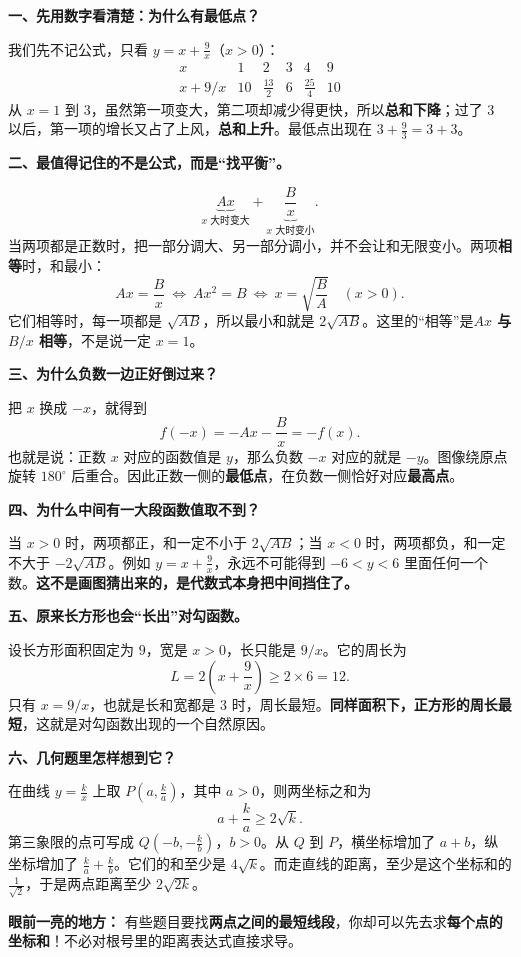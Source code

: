 \begin{explanationbox}
\textbf{一、先用数字看清楚：为什么有最低点？}

我们先不记公式，只看 $y=x+\frac9x$（$x>0$）：
\[
\begin{array}{c|ccccc}
x&1&2&3&4&9\\\hline
x+9/x&10&\frac{13}{2}&\boxed6&\frac{25}{4}&10
\end{array}
\]
从 $x=1$ 到 $3$，虽然第一项变大，第二项却减少得更快，所以\textbf{总和下降}；过了 $3$ 以后，第一项的增长又占了上风，\textbf{总和上升}。最低点出现在 $3+\frac93=3+3$。


\textbf{二、最值得记住的不是公式，而是“找平衡”。}

\[
\underbrace{Ax}_{\text{$x$ 大时变大}}+\underbrace{\frac Bx}_{\text{$x$ 大时变小}}.
\]
当两项都是正数时，把一部分调大、另一部分调小，并不会让和无限变小。两项\textbf{相等}时，和最小：
\[
Ax=\frac Bx\ \Longleftrightarrow\ Ax^2=B
\ \Longleftrightarrow\ x=\sqrt{\frac BA}\quad(x>0).
\]
它们相等时，每一项都是 $\sqrt{AB}$，所以最小和就是 $2\sqrt{AB}$。这里的“相等”是\textbf{$Ax$ 与 $B/x$ 相等}，不是说一定 $x=1$。

\medskip
\end{explanationbox}
\clearpage
\begin{explanationbox}
\textbf{三、为什么负数一边正好倒过来？}

把 $x$ 换成 $-x$，就得到
\[
f(-x)=-Ax-\frac Bx=-f(x).
\]
也就是说：正数 $x$ 对应的函数值是 $y$，那么负数 $-x$ 对应的就是 $-y$。图像绕原点旋转 $180^\circ$ 后重合。因此正数一侧的\textbf{最低点}，在负数一侧恰好对应\textbf{最高点}。

\medskip
\textbf{四、为什么中间有一大段函数值取不到？}

当 $x>0$ 时，两项都正，和一定不小于 $2\sqrt{AB}$；当 $x<0$ 时，两项都负，和一定不大于 $-2\sqrt{AB}$。例如 $y=x+\frac9x$，永远不可能得到 $-6<y<6$ 里面任何一个数。\textbf{这不是画图猜出来的，是代数式本身把中间挡住了。}

\medskip
\textbf{五、原来长方形也会“长出”对勾函数。}

设长方形面积固定为 $9$，宽是 $x>0$，长只能是 $9/x$。它的周长为
\[
L=2\left(x+\frac9x\right)\ge 2\times6=12.
\]
只有 $x=9/x$，也就是长和宽都是 $3$ 时，周长最短。\textbf{同样面积下，正方形的周长最短}，这就是对勾函数出现的一个自然原因。

\medskip
\textbf{六、几何题里怎样想到它？}

在曲线 $y=\frac{k}{x}$ 上取 $P(a,\frac{k}{a})$，其中 $a>0$，则两坐标之和为
\[
a+\frac{k}{a}\ge2\sqrt{k}.
\]
第三象限的点可写成 $Q(-b,-\frac{k}{b})$，$b>0$。从 $Q$ 到 $P$，横坐标增加了 $a+b$，纵坐标增加了 $\frac{k}{a}+\frac{k}{b}$。它们的和至少是 $4\sqrt{k}$。而走直线的距离，至少是这个坐标和的 $\frac1{\sqrt2}$，于是两点距离至少 $2\sqrt{2k}$。

\textbf{眼前一亮的地方：} 有些题目要找\textbf{两点之间的最短线段}，你却可以先去求\textbf{每个点的坐标和}！不必对根号里的距离表达式直接求导。
\end{explanationbox}

